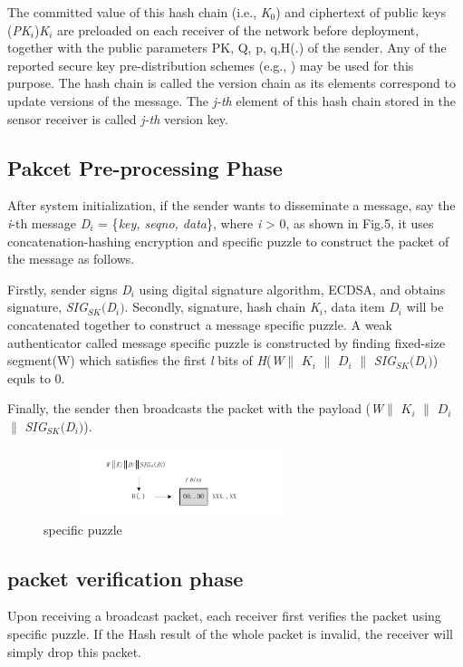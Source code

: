 \documentclass{sig-alternate-05-2015}
\begin{document}
The committed value of this hash chain (i.e., \emph{K$_0$}) and ciphertext of public keys (\emph{PK$_i$})\emph{K$_i$} are preloaded on each receiver of the network before deployment, together with the public parameters {PK, Q, p, q,H(.)} of the sender. Any of the reported secure key pre-distribution schemes (e.g., \cite{key_management}) may be used for this purpose. The hash chain is called the version chain as its elements correspond to update versions of the message. The \emph{j-th} element of this hash chain stored in the sensor receiver is called \emph{j-th} version key.

\subsection{Pakcet Pre-processing Phase}
	After system initialization, if the sender wants to disseminate a message, say the 
	\emph{i}-th message 
	\emph{D$_i$} = \{{\emph{key, seqno, data}}\}, where \emph{i} > 0, as shown in Fig.5, it uses concatenation-hashing encryption and specific puzzle to construct the packet of the message as follows. 

	Firstly, sender signs \emph{D$_i$} using digital signature algorithm, ECDSA, and obtains signature, \emph{SIG$_{SK}$$($D$_i$$)$}.
	Secondly, signature, hash chain \emph{K$_i$}, data item \emph{D$_i$} will be concatenated together to construct a message specific puzzle. A weak authenticator called message specific puzzle is constructed by finding fixed-size segment(W) which satisfies the first \emph{l} bits of 
\emph{H}(\emph{W}$\parallel$ $K_i$ $\parallel$ $D_i$ $\parallel$ \emph{SIG$_{SK}$$($D$_i$$)$})
equls to 0.

Finally, the sender then broadcasts the packet with the payload (\emph{W}$\parallel$ $K_i$ $\parallel$ $D_i$ $\parallel$ \emph{SIG$_{SK}$$($D$_i$$)$}).
		
\begin{figure}
\centering
\includegraphics[width=8cm,height=2cm]{specific_puzzle.pdf}
\caption{specific puzzle}
\label{} 
\end{figure}

\subsection{packet verification phase}
Upon receiving a broadcast packet, each receiver first verifies the packet using specific puzzle. If the Hash result of the whole packet is invalid, the receiver will simply drop this packet. 
\end{document}
